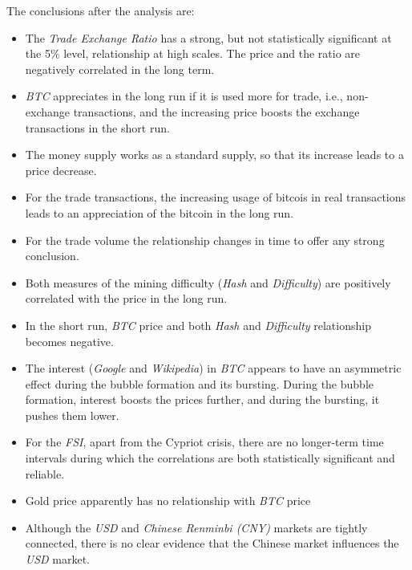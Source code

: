 The conclusions after the analysis are:
\begin{itemize}
\item The \textit{Trade Exchange Ratio} has a strong, but not
  statistically significant at the 5\% level, relationship at high
  scales. The price and the ratio are negatively correlated in the
  long term.
\item \textit{BTC} appreciates in the long run if it is used more for
  trade, i.e., non-exchange transactions, and the increasing price
  boosts the exchange transactions in the short run.
\item The money supply works as a standard supply, so that its
  increase leads to a price decrease.
\item For the trade transactions, the increasing usage of bitcois in
  real transactions leads to an appreciation of the bitcoin in the
  long run.
\item For the trade volume the relationship changes in time to offer
  any strong conclusion.
\item Both measures of the mining difficulty (\textit{Hash} and
  \textit{Difficulty}) are positively correlated with the price in the
  long run.
\item In the short run, \textit{BTC} price and both \textit{Hash} and
  \textit{Difficulty} relationship becomes negative.
\item The interest (\textit{Google} and \textit{Wikipedia}) in \textit{BTC}
  appears to have an asymmetric effect during the bubble formation and
  its bursting. During the bubble formation, interest boosts the
  prices further, and during the bursting, it pushes them lower.
\item For the \textit{FSI}, apart from the Cypriot crisis, there are
  no longer-term time intervals during which the correlations are both
  statistically significant and reliable.
\item Gold price apparently has no relationship with \textit{BTC} price
\item Although the \textit{USD} and \textit{Chinese Renminbi (CNY)}
  markets are tightly connected, there is no clear evidence that the
  Chinese market influences the \textit{USD} market.
\end{itemize}

